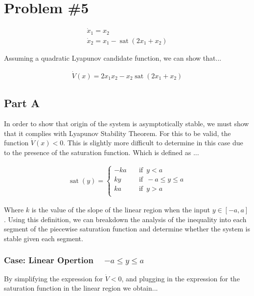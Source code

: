 \section*{Problem \#5}


$$
\begin{array}{l}
\dot{x}_{1}=x_{2} \\
\dot{x}_{2}=x_{1}-\operatorname{sat}\left(2 x_{1}+x_{2}\right)
\end{array}
$$


\noindent Assuming a quadratic Lyapunov candidate function, we can show that...

$$
\begin{array}{l}
\dot{V}(x) = 2x_1x_2 - x_2 \operatorname{sat}\left(2x_1 + x_2 \right)
\end{array}
$$

\subsection*{Part A}

In order to show that origin of the system is asymptotically stable, we must show that it complies with Lyapunov Stability Theorem. For this to be valid, the function $\dot{V}(x) < 0$. This is slightly more difficult to determine in this case due to the presence of the saturation function. Which is defined as ...


$$
\begin{array}{l}
\operatorname{sat}(y)=\begin{cases}
          -ka \quad &\text{if } \, y < a \\
          ky \quad &\text{if } \, -a\leq y \leq a\\
          ka \quad &\text{if } \, y >a \\
     \end{cases}
\end{array}
$$


\noindent Where $k$ is the value of the slope of the linear region when the input $ y \in \left[-a, a \right]$. Using this definition, we can breakdown the analysis of the inequality into each segment of the piecewise saturation function and determine whether the system is stable given each segment.

\subsubsection*{Case: Linear Opertion ~ $-a\leq y \leq a $}

\noindent By simplifying the expression for $\dot{V}<0$, and plugging in the expression for the saturation function in the linear region we obtain...



